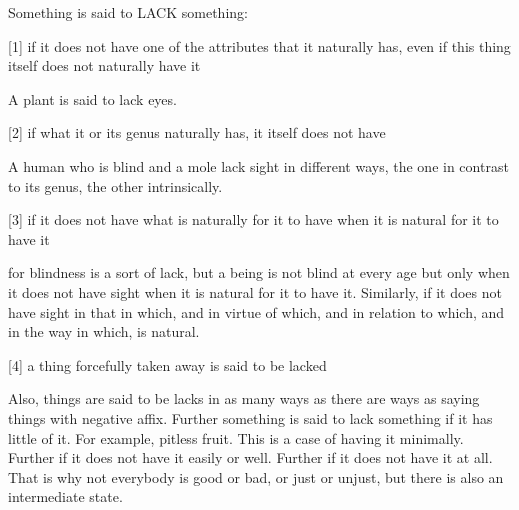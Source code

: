 Something is said to LACK something:

[1]     if it does not have one of the attributes that it naturally has,
        even if this thing itself does not naturally have it

        A plant is said to lack eyes.

[2]     if what it or its genus naturally has,
        it itself does not have

        A human who is blind and a mole lack sight in different ways,
        the one in contrast to its genus, the other intrinsically.

[3]     if it does not have what is naturally for it to have
        when it is natural for it to have it

        for blindness is a sort of lack, but a being is not
        blind at every age but only when it does not have sight
        when it is natural for it to have it. Similarly,
        if it does not have sight in that in which,
        and in virtue of which, and in relation to which,
        and in the way in which, is natural.

[4]     a thing forcefully taken away is said to be lacked

Also, things are said to be lacks in as many ways as there are
ways as saying things with negative affix. 
Further something is said to lack something if it has little of it.
For example, pitless fruit. This is a case of having it minimally.
Further if it does not have it easily or well.
Further if it does not have it at all.
That is why not everybody is good or bad, or just or unjust,
but there is also an intermediate state.
